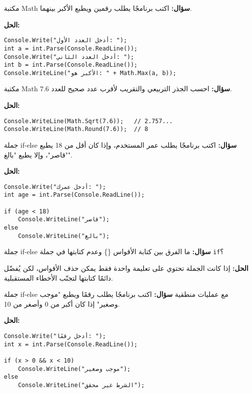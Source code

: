 \documentclass[12pt]{beamer}
\begin{document}
\begin{frame}[fragile]{مكتبة Math}
\textbf{سؤال:}
اكتب برنامجًا يطلب رقمين ويطبع الأكبر بينهما.

\pause
\textbf{الحل:}
\begin{lstlisting}[language={[Sharp]C}]
Console.Write("أدخل العدد الأول: ");
int a = int.Parse(Console.ReadLine());
Console.Write("أدخل العدد الثاني: ");
int b = int.Parse(Console.ReadLine());
Console.WriteLine("الأكبر هو: " + Math.Max(a, b));
\end{lstlisting}
\end{frame}

\begin{frame}[fragile]{مكتبة Math}
\textbf{سؤال:}
احسب الجذر التربيعي والتقريب لأقرب عدد صحيح للعدد 7.6.

\pause
\textbf{الحل:}
\begin{lstlisting}[language={[Sharp]C}]
Console.WriteLine(Math.Sqrt(7.6));   // 2.757...
Console.WriteLine(Math.Round(7.6));  // 8
\end{lstlisting}
\end{frame}

\begin{frame}[fragile]{جملة if-else}
\textbf{سؤال:}
اكتب برنامجًا يطلب عمر المستخدم، وإذا كان أقل من 18 يطبع "قاصر"، وإلا يطبع "بالغ".

\pause
\textbf{الحل:}
\begin{lstlisting}[language={[Sharp]C}]
Console.Write("أدخل عمرك: ");
int age = int.Parse(Console.ReadLine());

if (age < 18)
    Console.WriteLine("قاصر");
else
    Console.WriteLine("بالغ");
\end{lstlisting}
\end{frame}

\begin{frame}{جملة if-else}
\textbf{سؤال:}
ما الفرق بين كتابة الأقواس \{\} وعدم كتابتها في جملة \texttt{if}؟

\pause
\textbf{الحل:}
إذا كانت الجملة تحتوي على تعليمة واحدة فقط يمكن حذف الأقواس،
لكن يُفضّل دائمًا كتابتها لتجنّب الأخطاء المستقبلية.
\end{frame}

\begin{frame}[fragile]{جملة if-else مع عمليات منطقية}
\textbf{سؤال:}
اكتب برنامجًا يطلب رقمًا ويطبع "موجب وصغير" إذا كان أكبر من 0 وأصغر من 10.

\pause
\textbf{الحل:}
\begin{lstlisting}[language={[Sharp]C}]
Console.Write("أدخل رقمًا: ");
int x = int.Parse(Console.ReadLine());

if (x > 0 && x < 10)
    Console.WriteLine("موجب وصغير");
else
    Console.WriteLine("الشرط غير محقق");
\end{lstlisting}
\end{frame}
\end{document}
